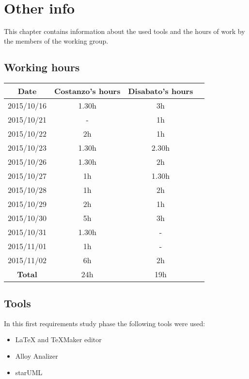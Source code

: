 \chapter{Other info}
\label{otherInfo}
This chapter contains information about the used tools and the hours of work by the members of the working group.

\section{Working hours}
\begin{table}[h]
\begin{tabular}{cccc}
\hline
 Date & Costanzo's hours & Disabato's hours  &    \\ \hline
 2015/10/16 & 1.30h & 3h &    \\ \hline
 2015/10/21 & - & 1h &    \\ \hline
2015/10/22 & 2h & 1h &    \\ \hline
2015/10/23 & 1.30h & 2.30h &    \\ \hline
2015/10/26 & 1.30h & 2h &    \\ \hline
2015/10/27 & 1h & 1.30h &    \\ \hline
2015/10/28 & 1h & 2h &    \\ \hline
2015/10/29 & 2h & 1h & \\ \hline
2015/10/30 & 5h & 3h &    \\ \hline
2015/10/31 & 1.30h & - &    \\ \hline
2015/11/01 & 1h & - &    \\ \hline
2015/11/02 & 6h & 2h &    \\ \hline
\textbf{Total} & 24h & 19h &    \\ \hline
\end{tabular}
\end{table}


\section{Tools}
In this first requirements study phase the following tools were used:
\begin{itemize}
	\item \LaTeX{} and TeXMaker editor
	\item Alloy Analizer
	\item starUML
\end{itemize}

\acresetall